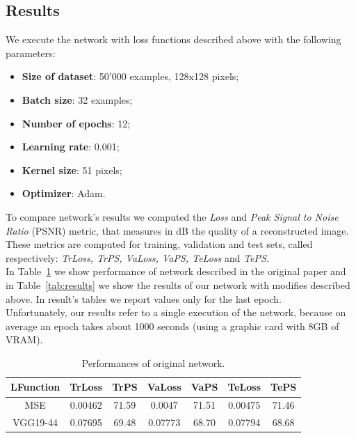 \documentclass[11pt, a4paper]{article}
\begin{document}
	\subsection{Results}
	We execute the network with loss functions described above with the following parameters:
	\begin{itemize}
		\item \textbf{Size of dataset}: 50'000 examples, 128x128 pixels;
		\item \textbf{Batch size}: 32 examples;
		\item \textbf{Number of epochs}: 12;
		\item \textbf{Learning rate}: 0.001;
		\item \textbf{Kernel size}: 51 pixels;
		\item \textbf{Optimizer}: Adam.
	\end{itemize}
	To compare network's results we computed the \textit{Loss} and \textit{Peak Signal to Noise Ratio} (PSNR) metric, that measures in dB the quality of a reconstructed image. These metrics are computed for training, validation and test sets, called respectively: \textit{TrLoss, TrPS, VaLoss, VaPS, TeLoss} and \textit{TePS}.\\
	In Table~\ref{tab:old_results} we show performance of network described in the original paper \cite{mainpaper} and in Table~\ref{tab:results} we show the results of our network with modifies described above. In result's tables we report values only for the last epoch.\\
	Unfortunately, our results refer to a single execution of the network, because on average an epoch takes about 1000 seconds (using a graphic card with 8GB of VRAM). 

	\begin{table}
		\centering
		\begin{tabular}{|c|c|c|c|c|c|c|}
			\hline
			\textbf{LFunction} & \textbf{TrLoss} & \textbf{TrPS} & \textbf{VaLoss} & \textbf{VaPS} & \textbf{TeLoss} & \textbf{TePS}\\
			\hline
			MSE & 0.00462 & 71.59 & 0.0047 & 71.51 & 0.00475 & 71.46\\
			\hline
			VGG19-44 & 0.07695 & 69.48 & 0.07773 & 68.70 & 0.07794 & 68.68\\
			\hline
		\end{tabular}
		\caption{Performances of original network.}
		\label{tab:old_results}
	\end{table}
\end{document}
